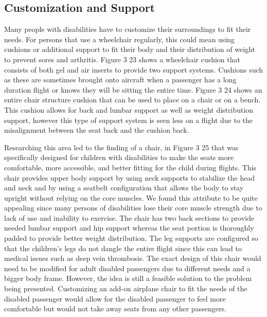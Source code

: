 \documentclass[a4paper, 12pt,conference]{new_cit_thesis}
\begin{document}
\subsection{Customization and Support}
Many people with disabilities have to customize their surroundings to fit their needs.  For persons that use a wheelchair regularly, this could mean using cushions or additional support to fit their body and their distribution of weight to prevent sores and arthritis. Figure 3 23 shows a wheelchair cushion that consists of both gel and air inserts to provide two support systems.  Cushions such as these are sometimes brought onto aircraft when a passenger has a long duration flight or knows they will be sitting the entire time.  Figure 3 24 shows an entire chair structure cushion that can be used to place on a chair or on a bench.  This cushion allows for back and lumbar support as well as weight distribution support, however this type of support system is seen less on a flight due to the misalignment between the seat back and the cushion back.  

Researching this area led to the finding of a chair, in Figure 3 25 that was specifically designed for children with disabilities to make the seats more comfortable, more accessible, and better fitting for the child during flights.  This chair provides upper body support by using neck supports to stabilize the head and neck and by using a seatbelt configuration that allows the body to stay upright without relying on the core muscles.  We found this attribute to be quite appealing since many persons of disabilities lose their core muscle strength due to lack of use and inability to exercise.  The chair has two back sections to provide needed lumbar support and hip support whereas the seat portion is thoroughly padded to provide better weight distribution.  The leg supports are configured so that the children's legs do not dangle the entire flight since this can lead to medical issues such as deep vein thrombosis.  The exact design of this chair would need to be modified for adult disabled passengers due to different needs and a bigger body frame.  However, the idea is still a feasible solution to the problem being presented.  Customizing an add-on airplane chair to fit the needs of the disabled passenger would allow for the disabled passenger to feel more comfortable but would not take away seats from any other passengers. 
\end{document}

